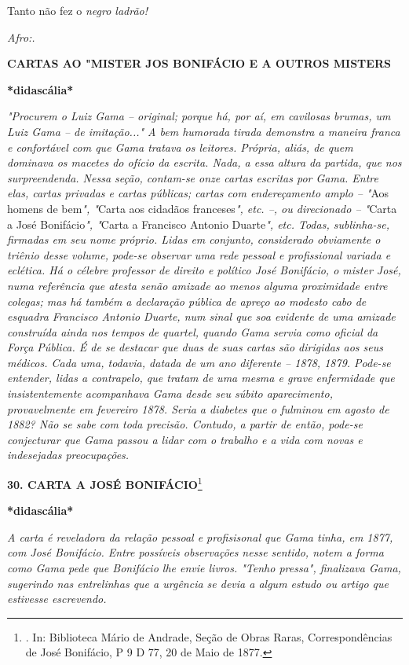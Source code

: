 Tanto não fez o \emph{negro ladrão!}

\emph{Afro:.}

\protect\hypertarget{Secao_Sem_Titulo-42}{}{}\textbf{CARTAS AO "MISTER
JOS BONIFÁCIO E A OUTROS MISTERS}

\textbf{*didascália*}

\emph{"Procurem o Luiz Gama -- original; porque há, por aí, em cavilosas
brumas, um Luiz Gama -- de imitação..." A bem humorada tirada demonstra
a maneira franca e confortável com que Gama tratava os leitores.
Própria, aliás, de quem dominava os macetes do ofício da escrita. Nada,
a essa altura da partida, que nos surpreendenda. Nessa seção, contam-se
onze cartas escritas por Gama. Entre elas, cartas privadas e cartas
públicas; cartas com endereçamento amplo -- "}Aos homens de bem\emph{",
"}Carta aos cidadãos franceses\emph{", etc. --, ou direcionado --
"}Carta a José Bonifácio\emph{", "}Carta a Francisco Antonio
Duarte\emph{", etc. Todas, sublinha-se, firmadas em seu nome próprio.
Lidas em conjunto, considerado obviamente o triênio desse volume,
pode-se observar uma rede pessoal e profissional variada e eclética. Há
o célebre professor de direito e político José Bonifácio, o mister José,
numa referência que atesta senão amizade ao menos alguma proximidade
entre colegas; mas há também a declaração pública de apreço ao modesto
cabo de esquadra Francisco Antonio Duarte, num sinal que soa evidente de
uma amizade construída ainda nos tempos de quartel, quando Gama servia
como oficial da Força Pública. É de se destacar que duas de suas cartas
são dirigidas aos seus médicos. Cada uma, todavia, datada de um ano
diferente -- 1878, 1879. Pode-se entender, lidas a contrapelo, que
tratam de uma mesma e grave enfermidade que insistentemente acompanhava
Gama desde seu súbito aparecimento, provavelmente em fevereiro 1878.
Seria a diabetes que o fulminou em agosto de 1882? Não se sabe com toda
precisão. Contudo, a partir de então, pode-se conjecturar que Gama
passou a lidar com o trabalho e a vida com novas e indesejadas
preocupações. }

\textbf{30. CARTA A JOSÉ BONIFÁCIO}\footnote{. In: Biblioteca Mário de
  Andrade, Seção de Obras Raras, Correspondências de José Bonifácio, P 9
  D 77, 20 de Maio de 1877.}

\textbf{*didascália*}

\emph{A carta é reveladora da relação pessoal e profisisonal que Gama
tinha, em 1877, com José Bonifácio. Entre possíveis observações nesse
sentido, notem a forma como Gama pede que Bonifácio lhe envie livros.
"Tenho pressa", finalizava Gama, sugerindo nas entrelinhas que a
urgência se devia a algum estudo ou artigo que estivesse escrevendo. }


